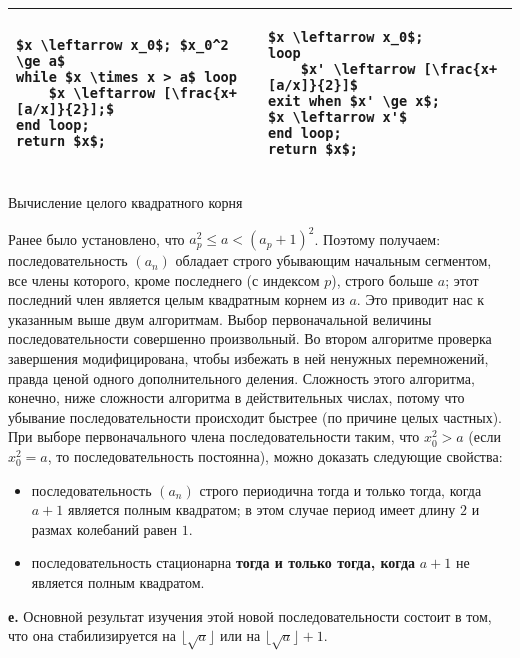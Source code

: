\begin{table}[]
\centering
\begin{tabular}{|l|l|}
\hline
{\begin{lstlisting}[frame=none, mathescape=true]
$x \leftarrow x_0$; $x_0^2 \ge a$
while $x \times x > a$ loop
	$x \leftarrow [\frac{x+[a/x]}{2}];$
end loop;
return $x$;
\end{lstlisting}} & {\begin{lstlisting}[frame=none, mathescape=true]
$x \leftarrow x_0$;
loop
	$x' \leftarrow [\frac{x+[a/x]}{2}]$
exit when $x' \ge x$;
$x \leftarrow x'$
end loop;
return $x$;
\end{lstlisting}} \\ \hline
\end{tabular}
\end{table}
\begin{center}
Вычисление целого квадратного корня
\end{center}
Ранее было установлено, что $a^{2}_{p} \leqslant a < (a_{p} + 1)^{2}$. Поэтому получаем: последовательность $(a_{n})$ обладает строго убывающим начальным сегментом, все члены которого, кроме последнего (с индексом $p$), строго больше $a$; этот последний член является целым квадратным корнем из $a$. Это приводит нас к указанным выше двум алгоритмам. Выбор первоначальной величины последовательности совершенно произвольный. Во втором алгоритме проверка завершения модифицирована, чтобы избежать в ней ненужных перемножений, правда ценой одного дополнительного деления. Сложность этого алгоритма, конечно, ниже сложности алгоритма в действительных числах, потому что убывание последовательности происходит быстрее (по причине целых частных). При выборе первоначального члена последовательности таким, что $x^{2}_{0} > a$ (если $x^{2}_{0} = a$, то последовательность постоянна), можно доказать следующие свойства:
\begin{itemize}
\item последовательность $(a_{n})$ строго периодична тогда и только тогда, когда $a + 1$ является полным квадратом; в этом случае период имеет длину $2$ и размах колебаний равен $1$.
\item последовательность стационарна \textbf{тогда и только тогда, когда} $a + 1$ не является полным квадратом.
\end{itemize}

\textbf{е.} Основной результат изучения этой новой последовательности состоит в том, что она стабилизируется на $\lfloor \sqrt{a} \rfloor$ или на $\lfloor \sqrt{a} \rfloor + 1$.

